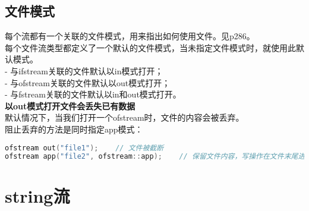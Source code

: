 \documentclass[
  a4paper,
  oneside,tablecaptionabove
]{scrbook}
\begin{document}
\subsection{文件模式}\label{ux6587ux4ef6ux6a21ux5f0f}

每个流都有一个关联的文件模式，用来指出如何使用文件。见p286。\\
每个文件流类型都定义了一个默认的文件模式，当未指定文件模式时，就使用此默认模式。\\
- 与ifstream关联的文件默认以in模式打开；\\
- 与ofstream关联的文件默认以out模式打开；\\
- 与fstream关联的文件默认以in和out模式打开。\\
\textbf{以out模式打开文件会丢失已有数据}\\
默认情况下，当我们打开一个ofstream时，文件的内容会被丢弃。\\
阻止丢弃的方法是同时指定app模式：

\begin{lstlisting}[language={C++}]
ofstream out("file1");    // 文件被截断
ofstream app("file2", ofstream::app);    // 保留文件内容，写操作在文件末尾进行
\end{lstlisting}

\section{string流}\label{stringux6d41}
\end{document}
